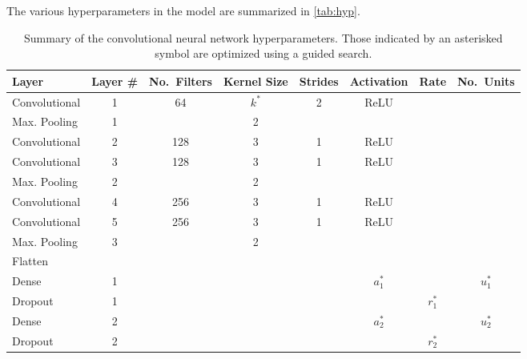 \documentclass[Journal,letterpaper, SingleSpace, InsideFigs]{ascelike-new}
\begin{document}
The various hyperparameters in the model are summarized in \autoref{tab:hyp}.
\begin{table}[]\small
{}
    \centering
    \begin{tabular}{l c c c c c c c}\toprule
    \bf Layer & \bf Layer \# & \bf No.\ Filters & \bf Kernel Size & \bf Strides &
    \bf Activation &   \bf Rate & \bf No.\ Units  \\\midrule
    Convolutional  & 1         & 64                & $k^*$   & 2           & ReLU && \\
    Max. Pooling   & 1         &                   & 2               &&&             &      \\
    Convolutional  & 2         & 128               & 3   & 1           & ReLU && \\
    Convolutional  & 3         & 128               & 3   & 1           & ReLU && \\
    Max. Pooling   & 2         &                   & 2               &&&             &      \\    
    Convolutional  & 4         & 256               & 3   & 1           & ReLU && \\
    Convolutional  & 5         & 256               & 3   & 1           & ReLU && \\
    Max. Pooling   & 3         &                   & 2               &             &&&      \\\midrule
    Flatten & & & & &&& \\\midrule
    Dense           & 1  & & &  &  $a_1^*$ & & $u_1^*$ \\
    Dropout         & 1  & & &  && $r_1^*$ &   \\
    Dense           & 2  & & &  &  $a_2^*$ & & $u_2^*$  \\
    Dropout         & 2  & & &  && $r_2^*$ &  \\ \bottomrule
    \end{tabular}
    \caption{Summary of the convolutional neural network hyperparameters. 
    Those indicated by an asterisked symbol are optimized using a guided search.}
    \label{tab:hyp}
\end{table}
\end{document}
